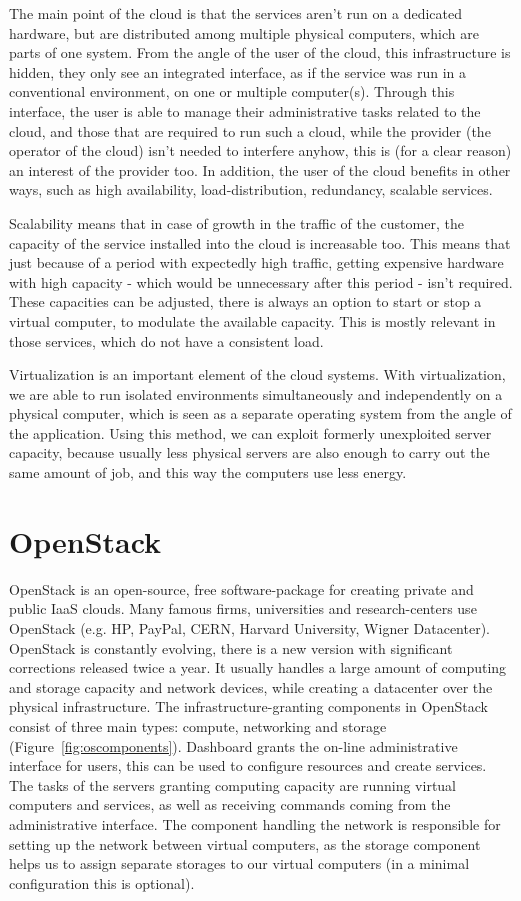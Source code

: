 \documentclass[a4paper]{article}
\begin{document}
The main point of the cloud is that the services aren't run on a dedicated hardware, but are distributed among multiple
physical computers, which are parts of one system.  From the angle of the user of the cloud, this infrastructure is
hidden, they only see an integrated interface, as if the service was run in a conventional environment, on one or
multiple computer(s). Through this interface, the user is able to manage their administrative tasks related to the
cloud, and those that are required to run such a cloud, while the provider (the operator of the cloud) isn't needed to
interfere anyhow, this is (for a clear reason) an interest of the provider too. In addition, the user of the cloud
benefits in other ways, such as high availability, load-distribution, redundancy, scalable services.

Scalability means that in case of growth in the traffic of the customer, the capacity of the service installed into the
cloud is increasable too. This means that just because of a period with expectedly high traffic, getting expensive
hardware with high capacity - which would be unnecessary after this period - isn't required. These capacities can be
adjusted, there is always an option to start or stop a virtual computer, to modulate the available capacity. This is
mostly relevant in those services, which do not have a consistent load.

Virtualization is an important element of the cloud systems. With virtualization, we are able to run isolated
environments simultaneously and independently on a physical computer, which is seen as a separate operating system from
the angle of the application. Using this method, we can exploit formerly unexploited server capacity, because usually
less physical servers are also enough to carry out the same amount of job, and this way the computers use less energy.

\section{OpenStack}

OpenStack is an open-source, free software-package for creating private and public IaaS clouds. Many famous firms,
universities and research-centers use OpenStack (e.g. HP, PayPal, CERN, Harvard University, Wigner Datacenter).
OpenStack is constantly evolving, there is a new version with significant corrections released twice a year. It usually
handles a large amount of computing and storage capacity and network devices, while creating a datacenter over the
physical infrastructure. The infrastructure-granting components in OpenStack consist of three main types: compute,
networking and storage (Figure~\ref{fig:oscomponents}). Dashboard grants the on-line administrative interface for
users, this can be used to configure resources and create services. The tasks of the servers granting computing
capacity are running virtual computers and services, as well as receiving commands coming from the administrative
interface. The component handling the network is responsible for setting up the network between virtual computers, as
the storage component helps us to assign separate storages to our virtual computers (in a minimal configuration this is
optional).
\end{document}
